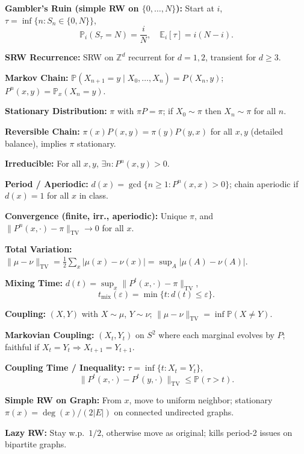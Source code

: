 \documentclass[answers,12pt,addpoints]{exam}
\begin{document}

\textbf{Gambler's Ruin (simple RW on $\{0,\dots,N\}$):}
Start at $i$, $\tau=\inf\{n:S_n\in\{0,N\}\}$,
\[
\mathbb{P}_i(S_\tau=N)=\frac{i}{N},\quad \mathbb{E}_i[\tau]=i(N-i).
\]

\textbf{SRW Recurrence:}
SRW on $\mathbb{Z}^d$ recurrent for $d=1,2$, transient for $d\ge3$.  


\textbf{Markov Chain:}
$\mathbb{P}(X_{n+1}=y\mid X_0,\dots,X_n)=P(X_n,y)$; $P^n(x,y)=\mathbb{P}_x(X_n=y)$.  

\textbf{Stationary Distribution:}
$\pi$ with $\pi P=\pi$; if $X_0\sim\pi$ then $X_n\sim\pi$ for all $n$.  

\textbf{Reversible Chain:}
$\pi(x)P(x,y)=\pi(y)P(y,x)$ for all $x,y$ (detailed balance), implies $\pi$ stationary.  

\textbf{Irreducible:}
For all $x,y$, $\exists n: P^n(x,y)>0$.  

\textbf{Period / Aperiodic:}
$d(x)=\gcd\{n\ge1:P^n(x,x)>0\}$; chain aperiodic if $d(x)=1$ for all $x$ in class.  

\textbf{Convergence (finite, irr., aperiodic):}
Unique $\pi$, and $\|P^n(x,\cdot)-\pi\|_\mathrm{TV}\to0$ for all $x$.  


\textbf{Total Variation:}
$\|\mu-\nu\|_\mathrm{TV}=\frac12\sum_x|\mu(x)-\nu(x)|=\sup_A|\mu(A)-\nu(A)|$.  

\textbf{Mixing Time:}
$d(t)=\sup_x\|P^t(x,\cdot)-\pi\|_\mathrm{TV}$,
\[
t_\mathrm{mix}(\varepsilon)=\min\{t:d(t)\le\varepsilon\}.
\]

\textbf{Coupling:}
$(X,Y)$ with $X\sim\mu$, $Y\sim\nu$; $\|\mu-\nu\|_\mathrm{TV}=\inf \mathbb{P}(X\neq Y)$.  

\textbf{Markovian Coupling:}
$(X_t,Y_t)$ on $S^2$ where each marginal evolves by $P$; faithful if $X_t=Y_t\Rightarrow X_{t+1}=Y_{t+1}$.  

\textbf{Coupling Time / Inequality:}
$\tau=\inf\{t:X_t=Y_t\}$,
\[
\|P^t(x,\cdot)-P^t(y,\cdot)\|_\mathrm{TV}\le\mathbb{P}(\tau>t).
\]


\textbf{Simple RW on Graph:}
From $x$, move to uniform neighbor; stationary $\pi(x)=\deg(x)/(2|E|)$ on connected undirected graphs.  

\textbf{Lazy RW:}
Stay w.p.\ $1/2$, otherwise move as original; kills period-2 issues on bipartite graphs.  
\end{document}
